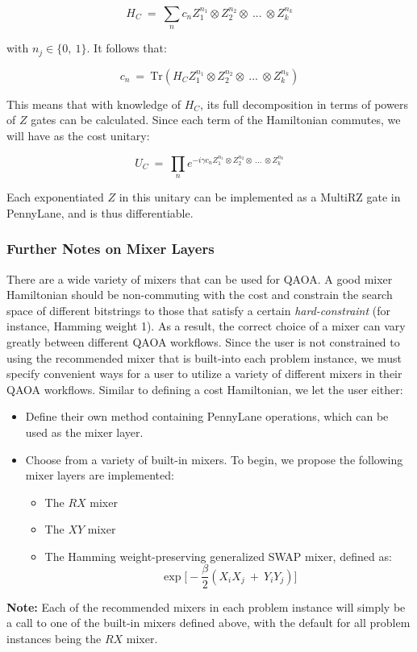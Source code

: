 \documentclass{article}
\begin{document}
$$H_C \ = \ \displaystyle\sum_{n} c_n Z_1^{n_1} \otimes Z_2^{n_2} \otimes \ ... \ \otimes Z_{k}^{n_k}$$

\noindent
with $n_j \in \{0, \ 1\}$. It follows that:

$$c_n \ = \ \text{Tr}( H_C Z_1^{n_1} \otimes Z_2^{n_2} \otimes \ ... \ \otimes Z_{k}^{n_k})$$

\noindent
This means that with knowledge of $H_C$, its full decomposition in terms of powers 
of $Z$ gates can be calculated. Since each term of the Hamiltonian commutes, we 
will have as the cost unitary:

$$U_C \ = \ \displaystyle\prod_{n} e^{- i \gamma c_n Z_1^{n_1} \otimes Z_2^{n_2} \otimes \ ... \ \otimes Z_{k}^{n_k}}$$

\noindent
Each exponentiated $Z$ in this unitary can be implemented as a MultiRZ gate in
PennyLane, and is thus differentiable.

\subsubsection{Further Notes on Mixer Layers}

There are a wide variety of mixers that can be used for QAOA. A good mixer 
Hamiltonian should be non-commuting with the cost and constrain the search space of different bitstrings 
to those that satisfy a certain \textit{hard-constraint} (for instance, Hamming weight 1). As a result, the correct 
choice of a mixer can vary greatly between different QAOA workflows.
\newline\newline
\noindent
Since the user is not constrained to using the recommended mixer that is built-into each 
problem instance, we must specify convenient ways for a user to utilize a variety of different 
mixers in their QAOA workflows.
\newline\newline
\noindent
Similar to defining a cost Hamiltonian, we let the user either: 
\begin{itemize}
	\item Define their own method 
	      containing PennyLane operations, which 
	      can be used as the mixer layer. 
	\item Choose from a variety of built-in mixers.
              To begin, we propose the following mixer layers are implemented:

		\begin{itemize}
			\item The $RX$ mixer
			\item The $XY$ mixer
			\item The Hamming weight-preserving generalized SWAP mixer, defined as:
				$$\exp \Big[ - \frac{\beta}{2} (X_{i} X_{j} \ + \ Y_{i} Y_{j}) \Big]$$
		\end{itemize}
\end{itemize}
\noindent
\textbf{Note:} Each of the recommended mixers in each problem instance will simply be a call 
to one of the built-in mixers defined above, with the default for all problem instances
being the $RX$ mixer.
\end{document}
